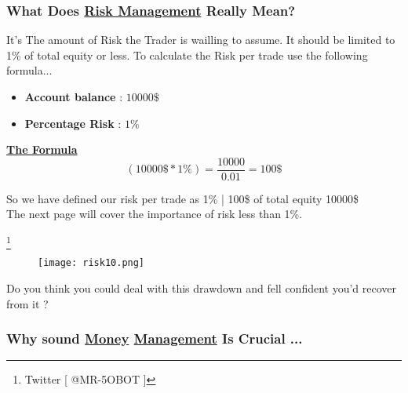 \documentclass[10pt]{article}
\begin{document}
\subsubsection*{What Does \underline{Risk Management} Really Mean?}
\begin{violetbox}
\small It's The amount of Risk the Trader is wailling to assume. It should be limited to 1\% of total equity or less. To calculate the Risk per trade use the following formula...
\end{violetbox}

\begin{itemize}
  \item \textbf{Account balance} : $ 10000\$ $
  \item  \textbf{Percentage Risk} : $ 1\% $ 
\end{itemize}

\begin{center}
   \textbf{ \underline{The Formula}}
\vspace{0.1cm}
  \[ ( 10000\$ * 1\% ) = \frac{10000}{0.01} = 100\$ \]
\end{center}

\vspace{0.2cm}
\begin{notesbox}
  \small{  So we have defined our risk per trade as 1\% | 100\$ of total equity 10000\$ \\
  The next page will cover the importance of risk less than 1\%. } 
\end{notesbox}

\footnote{Twitter [ @MR-5OBOT ]}
\newpage 


\begin{center}
\begin{figure}
   \texttt{[image: risk10.png]}
\end{figure}
\end{center}

\small{\begin{tcolorbox}[colback=blue!10!white,colframe=red!70!black,title=Question]
    Do you think you could deal with this drawdown and fell confident you'd recover from it ?
\end{tcolorbox}}
\hfill

\subsubsection*{Why sound \underline{Money}\hspace{0.01cm} \underline{Management} Is Crucial ...}
\vspace{0.2cm}
\end{document}
